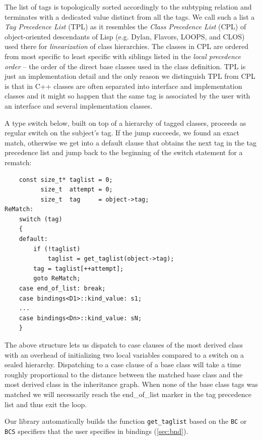 \documentclass[preprint]{sigplanconf}
\makeatletter
\DeclareRobustCommand{\code}[1]{{\lstinline[breaklines=false,escapechar=@]{#1}}}
\makeatother
\begin{document}
The list of tags is topologically sorted accordingly to the subtyping relation 
and terminates with a dedicated value distinct from all the tags. We call such a 
list a \emph{Tag Precedence List} (TPL) as it resembles the \emph{Class 
Precedence List} (CPL) of object-oriented descendants of Lisp (e.g. Dylan, 
Flavors, LOOPS, and CLOS) used there for \emph{linearization} of class 
hierarchies. The classes in CPL are ordered from most specific to least specific 
with siblings listed in the \emph{local precedence order} -- the order of the 
direct base classes used in the class definition. TPL is just an implementation 
detail and the only reason we distinguish TPL from CPL is that in C++ classes 
are often separated into interface and implementation classes and it might so 
happen that the same tag is associated by the user with an interface and several 
implementation classes. 

A type switch below, built on top of a hierarchy of tagged classes, proceeds as 
regular switch on the subject's tag. If the jump succeeds, we found an exact 
match, otherwise we get into a default clause that obtains the next tag in the 
tag precedence list and jump back to the beginning of the switch statement for a 
rematch:

\begin{lstlisting}
    const size_t* taglist = 0;
          size_t  attempt = 0;
          size_t  tag     = object->tag;
ReMatch:
    switch (tag) 
    {
    default:
        if (!taglist) 
            taglist = get_taglist(object->tag);
        tag = taglist[++attempt];
        goto ReMatch;
    case end_of_list: break;
    case bindings<D1>::kind_value: s1;
    ...
    case bindings<Dn>::kind_value: sN;
    }
\end{lstlisting}

The above structure lets us dispatch to case clauses of the most derived class 
with an overhead of initializing two local variables compared to a switch on a 
sealed hierarchy. Dispatching to a case clause of a base class will take a time 
roughly proportional to the distance between the matched base class and the most 
derived class in the inheritance graph. When none of the base class tags was 
matched we will necessarily reach the end\_of\_list marker in the tag precedence 
list and thus exit the loop.

Our library automatically builds the function \code{get_taglist} based on the 
\code{BC} or \code{BCS} specifiers that the user specifies in bindings 
(\textsection\ref{sec:bnd}).
\end{document}
